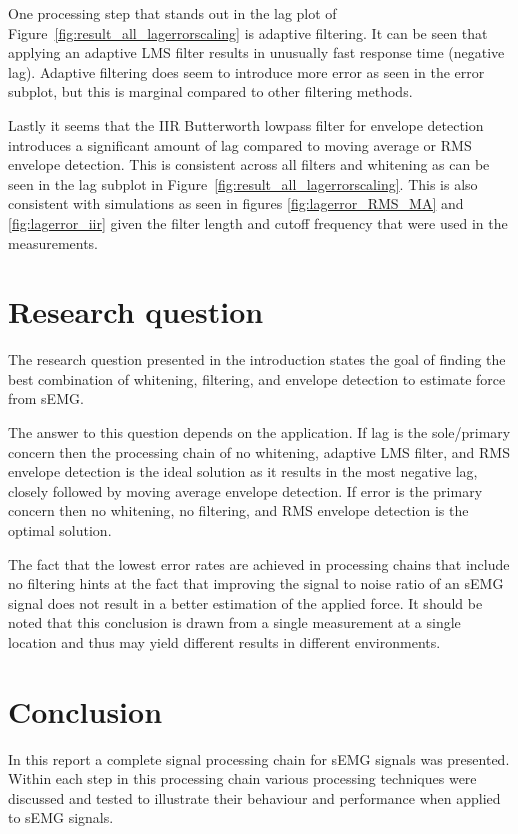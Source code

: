 One processing step that stands out in the lag plot of Figure~\ref{fig:result_all_lagerrorscaling} is adaptive filtering. It can be seen that applying an adaptive LMS filter results in unusually fast response time (negative lag). Adaptive filtering does seem to introduce more error as seen in the error subplot, but this is marginal compared to other filtering methods.

Lastly it seems that the IIR Butterworth lowpass filter for envelope detection introduces a significant amount of lag compared to moving average or RMS envelope detection. This is consistent across all filters and whitening as can be seen in the lag subplot in Figure~\ref{fig:result_all_lagerrorscaling}. This is also consistent with simulations as seen in figures \ref{fig:lagerror_RMS_MA} and \ref{fig:lagerror_iir} given the filter length and cutoff frequency that were used in the measurements. 

\section{Research question}
The research question presented in the introduction states the goal of finding the best combination of whitening, filtering, and envelope detection to estimate force from sEMG. 

The answer to this question depends on the application. If lag is the sole/primary concern then the processing chain of no whitening, adaptive LMS filter, and RMS envelope detection is the ideal solution as it results in the most negative lag, closely followed by moving average envelope detection. If error is the primary concern then no whitening, no filtering, and RMS envelope detection is the optimal solution. 

The fact that the lowest error rates are achieved in processing chains that include no filtering hints at the fact that improving the signal to noise ratio of an sEMG signal does not result in a better estimation of the applied force. It should be noted that this conclusion is drawn from a single measurement at a single location and thus may yield different results in different environments. 

\section{Conclusion}
In this report a complete signal processing chain for sEMG signals was presented. Within each step in this processing chain various processing techniques were discussed and tested to illustrate their behaviour and performance when applied to sEMG signals.


